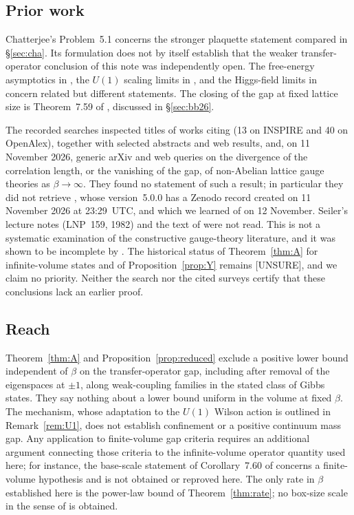 \documentclass[11pt,a4paper]{article}
\theoremstyle{plain}
\theoremstyle{definition}
\theoremstyle{remark}
\numberwithin{equation}{section}
\newcommand{\st}[1]{\textsf{[#1]}}
\begin{document}
\subsection{Prior work}\label{sec:prior}
Chatterjee's Problem~5.1 \cite{Cha18} concerns the stronger plaquette statement compared in \S\ref{sec:cha}.
Its formulation does not by itself establish that the weaker transfer-operator conclusion of this note was independently open.
The free-energy asymptotics in \cite{Cha16,Bre26}, the $U(1)$ scaling limits in \cite{Gro83,Dri87}, and the Higgs-field limits in
\cite{Cha24,RYZ26} concern related but different statements. The closing of the gap at fixed lattice size is Theorem~7.59 of \cite{BB26}, discussed in \S\ref{sec:bb26}.

The recorded searches inspected titles of works citing \cite{Cha18} (13 on INSPIRE and 40 on OpenAlex), together with selected
abstracts and web results, and, on 11 November 2026, generic arXiv and web queries on the divergence of the correlation length, or the
vanishing of the gap, of non-Abelian lattice gauge theories as $\beta\to\infty$. They found no statement of such a result; in particular they did not retrieve \cite{BB26}, whose
version~5.0.0 has a Zenodo record created on 11 November 2026 at 23:29~UTC, and which we learned of on 12 November. Seiler's lecture
notes (LNP~159, 1982) and the text of \cite{Sei78} were not read.
This is not a systematic examination of the constructive gauge-theory literature, and it was shown to be incomplete by \cite{BB26}.
The historical status of Theorem~\ref{thm:A} for infinite-volume states and of Proposition~\ref{prop:Y} remains \st{UNSURE}, and we claim no priority.
Neither the search nor the cited surveys certify that these conclusions lack an earlier proof.

\subsection{Reach}
Theorem~\ref{thm:A} and Proposition~\ref{prop:reduced} exclude a positive lower bound independent of $\beta$ on the transfer-operator gap,
including after removal of the eigenspaces at $\pm1$, along weak-coupling families in the stated class of Gibbs states.
They say nothing about a lower bound uniform in the volume at fixed $\beta$. The mechanism, whose adaptation to the $U(1)$ Wilson
action is outlined in Remark~\ref{rem:U1}, does not establish confinement or a positive continuum mass gap.
Any application to finite-volume gap criteria requires an additional argument connecting those criteria to the infinite-volume operator
quantity used here; for instance, the base-scale statement of Corollary~7.60 of \cite{BB26} concerns a finite-volume hypothesis and is not obtained or reproved here. The only rate in $\beta$ established here is the power-law bound of Theorem~\ref{thm:rate}; no box-size scale in the sense of \cite{BB26} is obtained.
\end{document}
